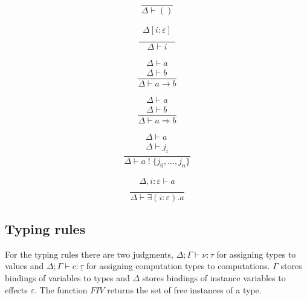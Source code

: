 \documentclass[12pt]{article}
\newcommand\eff[0]{\varepsilon}
\newcommand\ty[0]{\tau}
\newcommand\tunit[0]{()}
\newcommand\tarr[2]{#1 \rightarrow #2}
\newcommand\thandler[2]{#1 \Rightarrow #2}
\newcommand\cty[0]{\underline{\ty}}
\newcommand\aty[2]{#1 \; ! \; #2}
\newcommand\texists[3]{\exists(#1:#2) . #3}
\newcommand\val[0]{\nu}
\newcommand\comp[0]{c}
\begin{document}
\begin{minipage}{0.25\textwidth}
\[\frac{
	\begin{array}{l}
	\end{array}
}{
	\Delta \vdash \tunit
}\]
\end{minipage}
\begin{minipage}{0.25\textwidth}
\[\frac{
	\begin{array}{l}
	\Delta[i : \eff]  \\
	\end{array}
}{
	\Delta \vdash i
}\]
\end{minipage}
\begin{minipage}{0.25\textwidth}
\[\frac{
	\begin{array}{l}
	\Delta \vdash a  \\
	\Delta \vdash b
	\end{array}
}{
	\Delta \vdash \tarr{a}{b}
}\]
\end{minipage}
\begin{minipage}{0.25\textwidth}
\[\frac{
	\begin{array}{l}
	\Delta \vdash a  \\
	\Delta \vdash b
	\end{array}
}{
	\Delta \vdash \thandler{a}{b}
}\]
\end{minipage}
\begin{minipage}{0.5\textwidth}
\[\frac{
	\begin{array}{l}
	\Delta \vdash a  \\
	\Delta \vdash j_i
	\end{array}
}{
	\Delta \vdash \aty{a}{\{ j_0, ..., j_n \}}
}\]
\end{minipage}
\begin{minipage}{0.5\textwidth}
\[\frac{
	\begin{array}{l}
	\Delta , i : \eff \vdash a  \\
	\end{array}
}{
	\Delta \vdash \texists{i}{\eff}{a}
}\]
\end{minipage}

\newpage
\subsection{Typing rules}
For the typing rules there are two judgments,
$\Delta;\Gamma \vdash \val : \ty$ for assigning types to values and $\Delta;\Gamma \vdash \comp : \cty$ for assigning computation types to computations. $\Gamma$ stores bindings of variables to types and $\Delta$ stores bindings of instance variables to effects $\eff$.  The function $FIV$ returns the set of free instances of a type. \\
\end{document}
